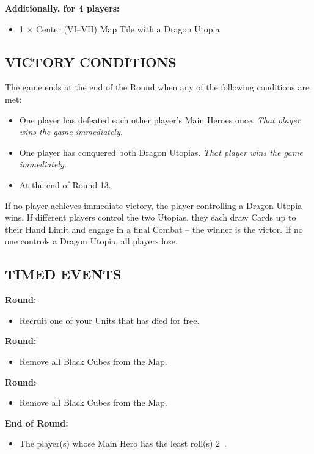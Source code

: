 \begin{multicols*}{2}
\columnbreak
\textbf{Additionally, for 4 players:}
\begin{itemize}
  \item 1 × Center (VI–VII) Map Tile with a Dragon Utopia
\end{itemize}

\subsection*{\MakeUppercase{Victory Conditions}}
The game ends at the end of the Round when any of the following conditions are met:

\begin{itemize}
 \item One player has defeated each other player's Main Heroes once. \textit{That player wins the game immediately.}
 \item One player has conquered both Dragon Utopias. \textit{That player wins the game immediately.}
 \item At the end of Round 13.
\end{itemize}

If no player achieves immediate victory, the player controlling a Dragon Utopia wins.
If different players control the two Utopias, they each draw Cards up to their Hand Limit and engage in a final Combat -- the winner is the victor.
If no one controls a Dragon Utopia, all players lose.
\subsection*{\MakeUppercase{Timed Events}}

\textbf{ Round:}
\begin{itemize}
  \item Recruit one of your Units that has died for free.
\end{itemize}
\textbf{ Round:}
\begin{itemize}
  \item Remove all Black Cubes from the Map.
\end{itemize}
\textbf{ Round:}
\begin{itemize}
  \item Remove all Black Cubes from the Map.
\end{itemize}
\textbf{End of  Round:}
\begin{itemize}
  \item The player(s) whose Main Hero has the least  roll(s) 2~.
\end{itemize}


\end{multicols*}
